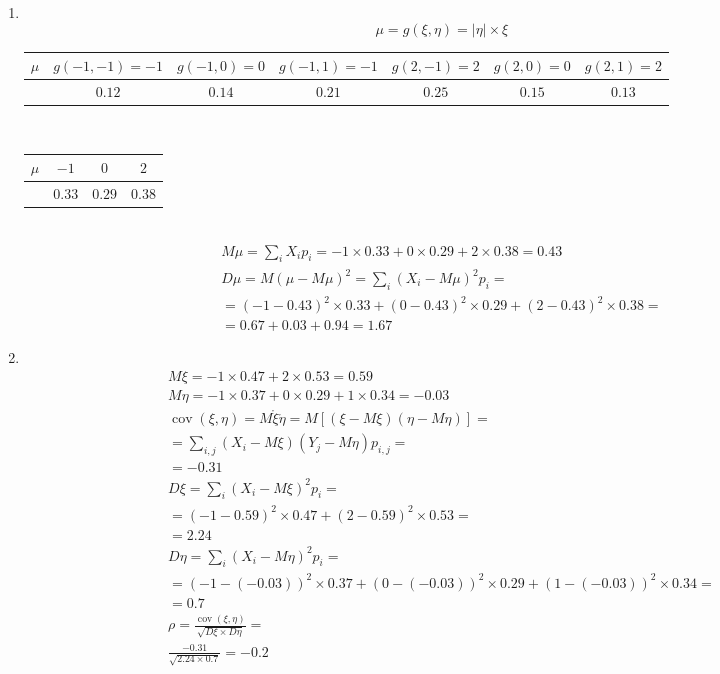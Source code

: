 \documentclass[12pt]{article}
\DeclareMathOperator{\cov}{cov}
\begin{document}
\begin{enumerate}
	\item \mbox{}\\
	      \[\mu = g(\xi, \eta) = |\eta| \times \xi\]
	      \begin{tabular}{|c|c|c|c|c|c|c|}
		      \hline
		      $\mu$ & $g(-1, -1) = -1$ & $g(-1, 0) = 0$ & $g(-1, 1) = -1$ & $g(2, -1) = 2$ & $g(2, 0) = 0$ & $g(2, 1) = 2$ \\
		      \hline
		            & $0.12$           & $0.14$         & $0.21$          & $0.25$         & $0.15$        & $0.13$        \\
		      \hline
	      \end{tabular} \\
	      \begin{tabular}{|c|c|c|c|}
		      \hline
		      $\mu$ & $-1$   & $0$    & $2$    \\
		      \hline
		            & $0.33$ & $0.29$ & $0.38$ \\
		      \hline
	      \end{tabular} \\
	      \begin{gather*}
		      M\mu = \sum_iX_ip_i = -1 \times 0.33 + 0 \times 0.29 + 2 \times 0.38 = 0.43 \\
		      D\mu = M(\mu - M\mu)^2 = \sum_i\left(X_i-M\mu\right)^2p_i = \\
		      = (-1 - 0.43)^2 \times 0.33 + (0 - 0.43)^2 \times 0.29 + (2 - 0.43)^2 \times 0.38 = \\
		      = 0.67 + 0.03 + 0.94 = 1.67
	      \end{gather*}

	\item \mbox{}\\
	      \begin{gather*}
		      M\xi = -1 \times 0.47 + 2 \times 0.53 = 0.59 \\
		      M\eta = -1 \times 0.37 + 0 \times 0.29 + 1 \times 0.34 = -0.03 \\
		      \cov(\xi, \eta) = M\mathring{\xi}\mathring{\eta} = M\left[\left(\xi - M\xi\right)\left(\eta - M\eta\right)\right] = \\
		      = \sum_{i, j}\left(X_i - M\xi\right)\left(Y_j - M\eta\right)p_{i,j} = \\
		      = -0.31 \\ %
		      D\xi = \sum_i\left(X_i-M\xi\right)^2p_i = \\
		      = (-1 - 0.59)^2 \times 0.47 + (2 - 0.59)^2 \times 0.53 = \\
		      = 2.24 \\
		      D\eta = \sum_i\left(X_i-M\eta\right)^2p_i = \\
		      = (-1 - (-0.03))^2 \times 0.37 + (0 - (-0.03))^2 \times 0.29 + (1 - (-0.03))^2 \times 0.34 = \\
		      = 0.7 \\
		      \rho = \frac{\cov(\xi, \eta)}{\sqrt{D\xi \times D\eta}} = \\
		      \frac{-0.31}{\sqrt{2.24 \times 0.7}} = -0.2
	      \end{gather*}
\end{enumerate}
\end{document}
